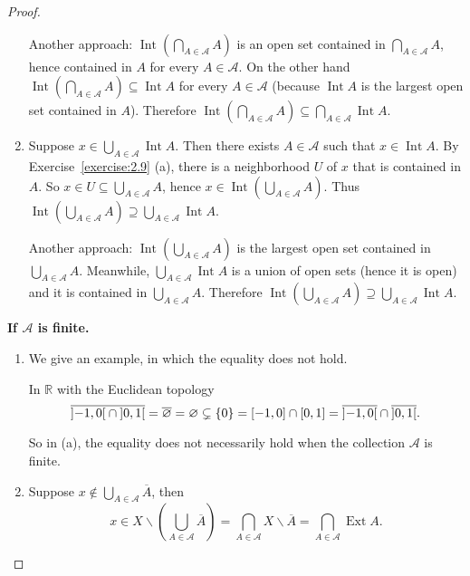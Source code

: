 \begin{proof}
\begin{enumerate}[label={(\alph*)}]
		      Another approach: $\displaystyle\operatorname{Int}\left(\bigcap_{A\in\mathscr{A}}A\right)$ is an open set contained in $\displaystyle\bigcap_{A\in\mathscr{A}}A$, hence contained in $A$ for every $A\in\mathscr{A}$. On the other hand $\displaystyle\operatorname{Int}\left(\bigcap_{A\in\mathscr{A}}A\right) \subseteq \operatorname{Int}A$ for every $A\in\mathscr{A}$ (because $\operatorname{Int}A$ is the largest open set contained in $A$). Therefore $\displaystyle\operatorname{Int}\left(\bigcap_{A\in\mathscr{A}}A\right)\subseteq \bigcap_{A\in\mathscr{A}}\operatorname{Int}A$.
		\item Suppose $x\in \bigcup_{A\in\mathscr{A}}\operatorname{Int}A$. Then there exists $A\in\mathscr{A}$ such that $x\in \operatorname{Int}A$. By Exercise~\ref{exercise:2.9} (a), there is a neighborhood $U$ of $x$ that is contained in $A$. So $x\in U\subseteq \bigcup_{A\in\mathscr{A}}A$, hence $x\in \operatorname{Int}\left(\bigcup_{A\in\mathscr{A}}A\right)$. Thus $\operatorname{Int}\left(\bigcup_{A\in\mathscr{A}}A\right) \supseteq  \bigcup_{A\in\mathscr{A}}\operatorname{Int}A$.

		      Another approach: $\displaystyle\operatorname{Int}\left(\bigcup_{A\in\mathscr{A}}A\right)$ is the largest open set contained in $\displaystyle\bigcup_{A\in\mathscr{A}}A$. Meanwhile, $\displaystyle\bigcup_{A\in\mathscr{A}}\operatorname{Int}A$ is a union of open sets (hence it is open) and it is contained in $\displaystyle\bigcup_{A\in\mathscr{A}}A$. Therefore $\displaystyle\operatorname{Int}\left(\bigcup_{A\in\mathscr{A}}A\right)\supseteq \bigcup_{A\in\mathscr{A}}\operatorname{Int}A$.
	\end{enumerate}
	\hfill

	\textbf{If $\mathscr{A}$ is finite.}
	\begin{enumerate}[label={(\alph*)}]
		\item  We give an example, in which the equality does not hold.

		      In $\mathbb{R}$ with the Euclidean topology
		      \[
			      \overline{\left]{-1,0}\right[ \cap \left]{0,1}\right[} = \overline{\varnothing} = \varnothing \subsetneq \{ 0 \} = \left[{-1,0}\right] \cap \left[{0,1}\right] = \overline{\left]{-1,0}\right[}\cap\overline{\left]{0,1}\right[}.
		      \]

		      So in (a), the equality does not necessarily hold when the collection $\mathscr{A}$ is finite.
		\item Suppose $x\notin \bigcup_{A\in\mathscr{A}}\overline{A}$, then
		      \[
			      x\in X\smallsetminus \left(\bigcup_{A\in\mathscr{A}}\overline{A}\right) = \bigcap_{A\in\mathscr{A}}X\smallsetminus\overline{A} = \bigcap_{A\in\mathscr{A}}\operatorname{Ext}A.
		      \]


\end{enumerate}
\end{proof}
